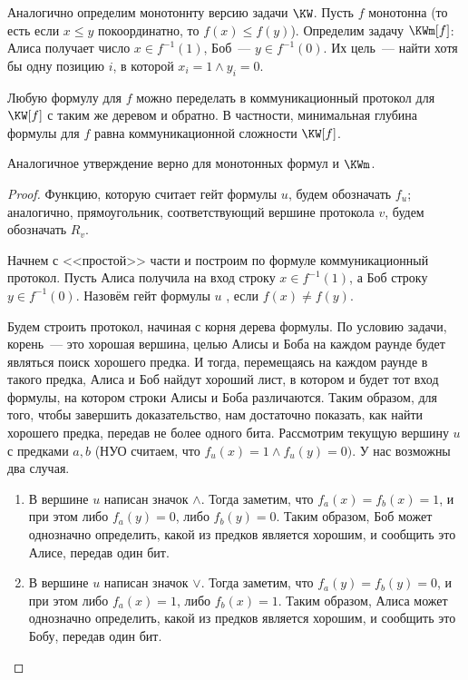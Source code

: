 Аналогично определим монотоннту версию задачи $\KW$. Пусть $f$ монотонна (то есть если $x \le y$
покоординатно, то $f(x) \le f(y)$). Определим задачу $\KWm[f]$: Алиса получает число $x \in f^{-1}(1)$,
Боб~--- $y \in f^{-1}(0)$. Их цель~--- найти хотя бы одну позицию $i$, в которой $x_i = 1 \land y_i = 0$.

\begin{theorem}
    \label{th:KW-theorem}
    Любую формулу для $f$ можно переделать в коммуникационный протокол для $\KW[f]$ с таким же деревом и
    обратно. В частности, минимальная глубина формулы для $f$ равна коммуникационной сложности $\KW[f]$.

    Аналогичное утверждение верно для монотонных формул и $\KWm$.
\end{theorem}

\begin{proof}
    Функцию, которую считает гейт формулы $u$, будем обозначать $f_u$; аналогично, прямоугольник,
    соответствующий вершине протокола $v$, будем обозначать $R_v$.
    
    Начнем с <<простой>> части и построим по формуле коммуникационный протокол. Пусть Алиса получила на
    вход строку $x \in f^{-1}(1)$, а Боб строку $y \in f^{-1}(0)$. Назовём гейт формулы $u$
    , если $f(x) \neq f(y)$.

    Будем строить протокол, начиная с корня дерева формулы. По условию задачи, корень~--- это хорошая
    вершина, целью Алисы и Боба на каждом раунде будет являться поиск хорошего предка. И тогда,
    перемещаясь на каждом раунде в такого предка, Алиса и Боб найдут хороший лист, в котором и будет тот
    вход формулы, на котором строки Алисы и Боба различаются. Таким образом, для того, чтобы завершить
    доказательство, нам достаточно показать, как найти хорошего предка, передав не более одного
    бита. Рассмотрим текущую вершину $u$ с предками $a, b$ (НУО считаем, что $f_u(x) = 1 \wedge f_u(y) =
    0)$. У нас возможны два случая.
    \begin{enumerate}
        \item В вершине $u$ написан значок $\wedge$. Тогда заметим, что $f_a(x) = f_b(x) = 1$, и при этом
            либо $f_a(y) = 0$, либо $f_b(y) = 0$. Таким образом, Боб может однозначно определить, какой
            из предков является хорошим, и сообщить это Алисе, передав один бит.
        \item В вершине $u$ написан значок $\vee$. Тогда заметим, что $f_a(y) = f_b(y) = 0$, и при этом
            либо $f_a(x) = 1$, либо $f_b(x) = 1$. Таким образом, Алиса может однозначно определить, какой
            из предков является хорошим, и сообщить это Бобу, передав один бит.
    \end{enumerate}



\end{proof}
